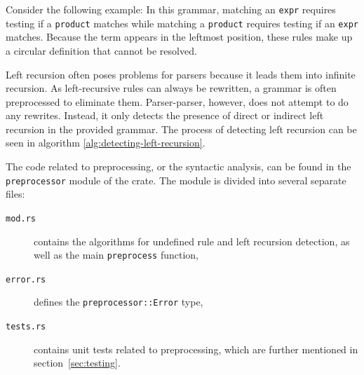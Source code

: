 \documentclass[english,engineering]{wizthesis}
\newcommand{\paraphrase}[1]{#1}
\newcommand{\thisproject}{Parser-parser}
\begin{document}
Consider the following example:
\paraphrase{In this grammar, matching an \texttt{expr} requires testing if a
\texttt{product} matches while matching a \texttt{product} requires testing if
an \texttt{expr} matches. Because the term appears in the leftmost position,
these rules make up a circular definition that cannot be resolved.}

\paraphrase{Left recursion often poses problems for parsers because it leads
them into infinite recursion. As left-recursive rules can always be rewritten, a
grammar is often preprocessed to eliminate them.} \thisproject{},
however, does not attempt to do any rewrites. Instead, it only detects the
presence of direct or indirect left recursion in the provided grammar. The
process of detecting left recursion can be seen in algorithm
\ref{alg:detecting-left-recursion}.

The code related to preprocessing, or the syntactic analysis, can be found in
the \texttt{preprocessor} module of the crate. The module is divided into
several separate files:
\begin{description}
  \item[\texttt{mod.rs}] contains the algorithms for undefined rule and left
  recursion detection, as well as the main \texttt{preprocess} function,
  \item[\texttt{error.rs}] defines the \texttt{preprocessor::Error}
  type,
  \item[\texttt{tests.rs}] contains unit tests related to preprocessing,
  which are further mentioned in section~\ref{sec:testing}.
\end{description}
\end{document}
